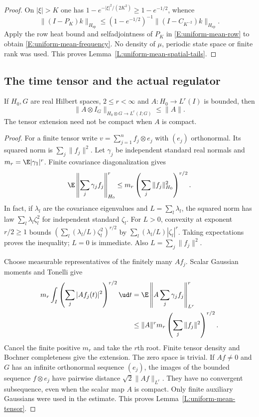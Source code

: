 \begin{proof}
  On $|\xi|>K$ one has
  $1-e^{-|\xi|^2/(2K^2)}\ge1-e^{-1/2}$, whence
  \[
    \|(I-P_K)k\|_{H_{\mathrm{sp}}}
    \le(1-e^{-1/2})^{-1}\|(I-C_{K^{-2}})k\|_{H_{\mathrm{sp}}}.
  \]
  Apply the row heat bound and selfadjointness of $P_K$ in
  \eqref{E:uniform-mean-row} to obtain
  \eqref{E:uniform-mean-frequency}.
  No density of $\mu$, periodic state space or finite rank was used.
  This proves Lemma~\ref{L:uniform-mean-spatial-tails}.
\end{proof}

\subsection{The time tensor and the actual regulator}

\begin{lemma}
  \label{L:uniform-mean-tensor}
  If $H_0,G$ are real Hilbert spaces, $2\le r<\infty$ and
  $A:H_0\to L^r(I)$ is bounded, then
  \[
    \|A\otimes I_G\|_{H_0\otimes G\to L^r(I;G)}\le\|A\|.
  \]
  The tensor extension need not be compact when $A$ is compact.
\end{lemma}

\begin{proof}
  For a finite tensor write $v=\sum_{j=1}^n f_j\otimes e_j$
  with $(e_j)$ orthonormal. Its squared norm is $\sum_j\|f_j\|^2$.
  Let $\gamma_j$ be independent standard real normals and
  $m_r=\E|\gamma_1|^r$. Finite covariance diagonalization gives
  \[
    \E\left\|\sum_j\gamma_j f_j\right\|_{H_0}^r
    \le m_r\left(\sum_j\|f_j\|_{H_0}^2\right)^{r/2}.
  \]
  In fact, if $\lambda_l$ are the covariance eigenvalues and
  $L=\sum_l\lambda_l$, the squared norm has law
  $\sum_l\lambda_l\zeta_l^2$ for independent standard $\zeta_l$.
  For $L>0$, convexity at exponent $r/2\ge1$ bounds
  $(\sum_l(\lambda_l/L)\zeta_l^2)^{r/2}$
  by $\sum_l(\lambda_l/L)|\zeta_l|^r$.
  Taking expectations proves the inequality; $L=0$ is immediate.
  Also $L=\sum_j\|f_j\|^2$.

  Choose measurable representatives of the finitely many $Af_j$.
  Scalar Gaussian moments and Tonelli give
  \begin{align*}
    m_r\int_I\left(\sum_j|Af_j(t)|^2\right)^{r/2}\ud t
    &=\E\left\|A\sum_j\gamma_jf_j\right\|_{L^r}^r\\
    &\le\|A\|^rm_r\left(\sum_j\|f_j\|^2\right)^{r/2}.
  \end{align*}
  Cancel the finite positive $m_r$ and take the $r$th root.
  Finite tensor density and Bochner completeness give the extension.
  The zero space is trivial.
  If $Af\ne0$ and $G$ has an infinite orthonormal sequence $(e_j)$,
  the images of the bounded sequence $f\otimes e_j$ have pairwise
  distance $\sqrt2\|Af\|_{L^r}$. They have no convergent subsequence,
  even when the scalar map $A$ is compact.
  Only finite auxiliary Gaussians were used in the estimate.
  This proves Lemma~\ref{L:uniform-mean-tensor}.
\end{proof}

